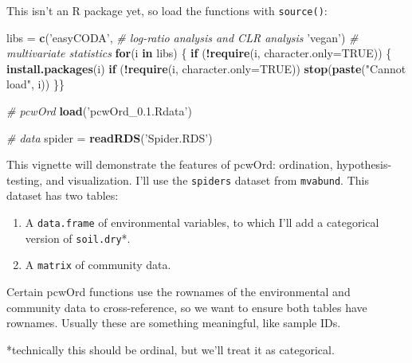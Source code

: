 \documentclass[
]{article}
\newenvironment{Shaded}{\begin{snugshade}}{\end{snugshade}}
\newcommand{\CommentTok}[1]{\textcolor[rgb]{0.56,0.35,0.01}{\textit{#1}}}
\newcommand{\ControlFlowTok}[1]{\textcolor[rgb]{0.13,0.29,0.53}{\textbf{#1}}}
\newcommand{\DataTypeTok}[1]{\textcolor[rgb]{0.13,0.29,0.53}{#1}}
\newcommand{\KeywordTok}[1]{\textcolor[rgb]{0.13,0.29,0.53}{\textbf{#1}}}
\newcommand{\NormalTok}[1]{#1}
\newcommand{\OperatorTok}[1]{\textcolor[rgb]{0.81,0.36,0.00}{\textbf{#1}}}
\newcommand{\OtherTok}[1]{\textcolor[rgb]{0.56,0.35,0.01}{#1}}
\newcommand{\StringTok}[1]{\textcolor[rgb]{0.31,0.60,0.02}{#1}}
\providecommand{\tightlist}{%
  \setlength{\itemsep}{0pt}\setlength{\parskip}{0pt}}
\begin{document}
This isn't an R package yet, so load the functions with
\texttt{source()}:

\begin{Shaded}
\begin{Highlighting}[]
\NormalTok{libs =}\StringTok{ }\KeywordTok{c}\NormalTok{(}\StringTok{'easyCODA'}\NormalTok{,  }\CommentTok{# log-ratio analysis and CLR analysis}
         \StringTok{'vegan'}\NormalTok{)     }\CommentTok{# multivariate statistics}
\ControlFlowTok{for}\NormalTok{(i }\ControlFlowTok{in}\NormalTok{ libs) \{}
  \ControlFlowTok{if}\NormalTok{ (}\OperatorTok{!}\KeywordTok{require}\NormalTok{(i, }\DataTypeTok{character.only=}\OtherTok{TRUE}\NormalTok{)) \{}
    \KeywordTok{install.packages}\NormalTok{(i)}
    \ControlFlowTok{if}\NormalTok{ (}\OperatorTok{!}\KeywordTok{require}\NormalTok{(i, }\DataTypeTok{character.only=}\OtherTok{TRUE}\NormalTok{)) }\KeywordTok{stop}\NormalTok{(}\KeywordTok{paste}\NormalTok{(}\StringTok{"Cannot load"}\NormalTok{, i))}
\NormalTok{  \}\}}

\CommentTok{# pcwOrd}
\KeywordTok{load}\NormalTok{(}\StringTok{'pcwOrd_0.1.Rdata'}\NormalTok{)}

\CommentTok{# data}
\NormalTok{spider =}\StringTok{ }\KeywordTok{readRDS}\NormalTok{(}\StringTok{'Spider.RDS'}\NormalTok{)}
\end{Highlighting}
\end{Shaded}

This vignette will demonstrate the features of pcwOrd: ordination,
hypothesis-testing, and visualization. I'll use the \texttt{spiders}
dataset from \texttt{mvabund}. This dataset has two tables:

\begin{enumerate}
\def\labelenumi{\arabic{enumi}.}
\tightlist
\item
  A \texttt{data.frame} of environmental variables, to which I'll add a
  categorical version of \texttt{soil.dry}*.
\item
  A \texttt{matrix} of community data.
\end{enumerate}

Certain pcwOrd functions use the rownames of the environmental and
community data to cross-reference, so we want to ensure both tables have
rownames. Usually these are something meaningful, like sample IDs.

*technically this should be ordinal, but we'll treat it as categorical.
\end{document}

